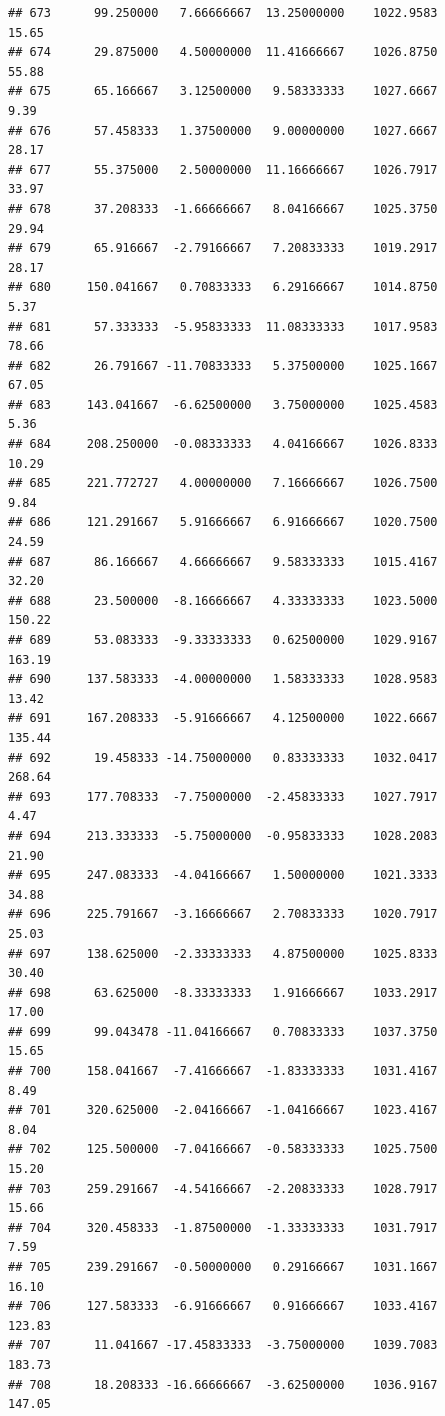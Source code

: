 \documentclass[
]{article}
\begin{document}
\begin{verbatim}
## 673      99.250000   7.66666667  13.25000000    1022.9583       15.65
## 674      29.875000   4.50000000  11.41666667    1026.8750       55.88
## 675      65.166667   3.12500000   9.58333333    1027.6667        9.39
## 676      57.458333   1.37500000   9.00000000    1027.6667       28.17
## 677      55.375000   2.50000000  11.16666667    1026.7917       33.97
## 678      37.208333  -1.66666667   8.04166667    1025.3750       29.94
## 679      65.916667  -2.79166667   7.20833333    1019.2917       28.17
## 680     150.041667   0.70833333   6.29166667    1014.8750        5.37
## 681      57.333333  -5.95833333  11.08333333    1017.9583       78.66
## 682      26.791667 -11.70833333   5.37500000    1025.1667       67.05
## 683     143.041667  -6.62500000   3.75000000    1025.4583        5.36
## 684     208.250000  -0.08333333   4.04166667    1026.8333       10.29
## 685     221.772727   4.00000000   7.16666667    1026.7500        9.84
## 686     121.291667   5.91666667   6.91666667    1020.7500       24.59
## 687      86.166667   4.66666667   9.58333333    1015.4167       32.20
## 688      23.500000  -8.16666667   4.33333333    1023.5000      150.22
## 689      53.083333  -9.33333333   0.62500000    1029.9167      163.19
## 690     137.583333  -4.00000000   1.58333333    1028.9583       13.42
## 691     167.208333  -5.91666667   4.12500000    1022.6667      135.44
## 692      19.458333 -14.75000000   0.83333333    1032.0417      268.64
## 693     177.708333  -7.75000000  -2.45833333    1027.7917        4.47
## 694     213.333333  -5.75000000  -0.95833333    1028.2083       21.90
## 695     247.083333  -4.04166667   1.50000000    1021.3333       34.88
## 696     225.791667  -3.16666667   2.70833333    1020.7917       25.03
## 697     138.625000  -2.33333333   4.87500000    1025.8333       30.40
## 698      63.625000  -8.33333333   1.91666667    1033.2917       17.00
## 699      99.043478 -11.04166667   0.70833333    1037.3750       15.65
## 700     158.041667  -7.41666667  -1.83333333    1031.4167        8.49
## 701     320.625000  -2.04166667  -1.04166667    1023.4167        8.04
## 702     125.500000  -7.04166667  -0.58333333    1025.7500       15.20
## 703     259.291667  -4.54166667  -2.20833333    1028.7917       15.66
## 704     320.458333  -1.87500000  -1.33333333    1031.7917        7.59
## 705     239.291667  -0.50000000   0.29166667    1031.1667       16.10
## 706     127.583333  -6.91666667   0.91666667    1033.4167      123.83
## 707      11.041667 -17.45833333  -3.75000000    1039.7083      183.73
## 708      18.208333 -16.66666667  -3.62500000    1036.9167      147.05

\end{verbatim}
\end{document}
